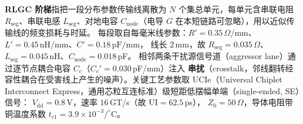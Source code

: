 \documentclass[11pt,a4paper,fontset=mac]{ctexart}
\newcommand{\term}[1]{\textbf{#1}}
\begin{document}
\term{RLGC 阶梯}指把一段分布参数传输线离散为 $N$ 个集总单元，每单元含串联电阻 $R_\text{seg}$、串联电感
$L_\text{seg}$、对地电容 $C_\text{node}$（电导 $G$ 在本短链路可忽略），用以近似传输线的频变损耗与时延。
每段取自每毫米线参数：$R'{=}0.35\,\Omega/\text{mm}$、$L'{=}0.45\,\text{nH/mm}$、$C'{=}0.18\,\text{pF/mm}$，
线长 $2\,$mm，故 $R_\text{seg}{=}0.035\,\Omega$、$L_\text{seg}{=}0.045\,$nH、$C_\text{node}{=}0.018\,$pF。
相邻两条干扰源信号道（aggressor lane）通过逐节点耦合电容 $C_c$（$C_c'{=}0.030\,$pF/mm）注入
\term{串扰}（crosstalk，邻线翻转经容性耦合在受害线上产生的噪声）。关键工艺参数取 UCIe（Universal
Chiplet Interconnect Express，通用芯粒互连标准）级短距低摆幅单端（single-ended, SE）信号：
$V_\text{dd}{=}0.8\,$V，速率 $16\,$GT/s（故 UI$=62.5\,$ps），
$Z_0{=}50\,\Omega$，导体电阻带铜温度系数 $t_{c1}{=}3.9\times10^{-3}/^\circ$C。
\end{document}
